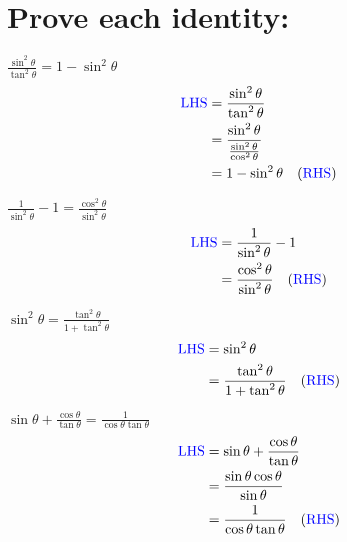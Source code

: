 \documentclass{article}
\begin{document}
\section{Prove each identity:}
\begin{multienum}
    \item $\frac{\sin ^2 \theta}{\tan ^2 \theta}=1-\sin ^2 \theta$
    \begin{align*}
        \text{\textcolor{blue}{LHS}} &= \frac{\sin ^2 \theta}{\tan ^2 \theta} \\
        &= \frac{\sin ^2 \theta}{\frac{\sin ^2 \theta}{\cos ^2 \theta}} \\
        &= 1-\sin ^2 \theta \quad (\text{\textcolor{blue}{RHS}})
    \end{align*}

    \item $\frac{1}{\sin ^2 \theta}-1=\frac{\cos ^2 \theta}{\sin ^2 \theta}$
    \begin{align*}
        \text{\textcolor{blue}{LHS}} &= \frac{1}{\sin ^2 \theta}-1 \\
        &= \frac{\cos ^2 \theta}{\sin ^2 \theta} \quad (\text{\textcolor{blue}{RHS}})
    \end{align*}

    \item $\sin ^2 \theta=\frac{\tan ^2 \theta}{1+\tan ^2 \theta}$
    \begin{align*}
        \text{\textcolor{blue}{LHS}} &= \sin ^2 \theta \\
        &= \frac{\tan ^2 \theta}{1+\tan ^2 \theta} \quad (\text{\textcolor{blue}{RHS}})
    \end{align*}

    \item $\sin \theta+\frac{\cos \theta}{\tan \theta}=\frac{1}{\cos \theta \tan \theta}$
    \begin{align*}
        \text{\textcolor{blue}{LHS}} &= \sin \theta+\frac{\cos \theta}{\tan \theta} \\
        &= \frac{\sin \theta \cos \theta}{\sin \theta} \\
        &= \frac{1}{\cos \theta \tan \theta} \quad (\text{\textcolor{blue}{RHS}})
    \end{align*}
\end{multienum}
\end{document}
